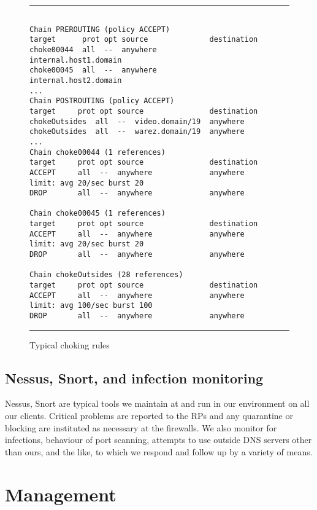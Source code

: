 \begin{figure*}[htpb!]
\hrule
\scriptsize
\begin{verbatim}

Chain PREROUTING (policy ACCEPT)
target      prot opt source              destination
choke00044  all  --  anywhere            internal.host1.domain
choke00045  all  --  anywhere            internal.host2.domain
...
Chain POSTROUTING (policy ACCEPT)
target     prot opt source               destination
chokeOutsides  all  --  video.domain/19  anywhere
chokeOutsides  all  --  warez.domain/19  anywhere
...
Chain choke00044 (1 references)
target     prot opt source               destination
ACCEPT     all  --  anywhere             anywhere     limit: avg 20/sec burst 20
DROP       all  --  anywhere             anywhere

Chain choke00045 (1 references)
target     prot opt source               destination
ACCEPT     all  --  anywhere             anywhere     limit: avg 20/sec burst 20
DROP       all  --  anywhere             anywhere

Chain chokeOutsides (28 references)
target     prot opt source               destination
ACCEPT     all  --  anywhere             anywhere     limit: avg 100/sec burst 100
DROP       all  --  anywhere             anywhere
\end{verbatim}
\normalsize
\hrule
\caption{Typical choking rules}
\label{fig:typical-choking-rules}
\end{figure*}



\subsection{Nessus, Snort, and infection monitoring}

Nessus, Snort are typical tools
\cite{nessus,snort,linux-firewalls-ids-2007,tao-net-sec-2005}
we maintain at and run in our environment on all our clients. Critical problems are reported
to the RPs and any quarantine or blocking are instituted as necessary at the firewalls.
We also monitor for infections, behaviour of port scanning, attempts to use outside
DNS servers other than ours, and the like, to which we respond and follow up by a variety of means.


\section{Management}
\label{sect:management}

